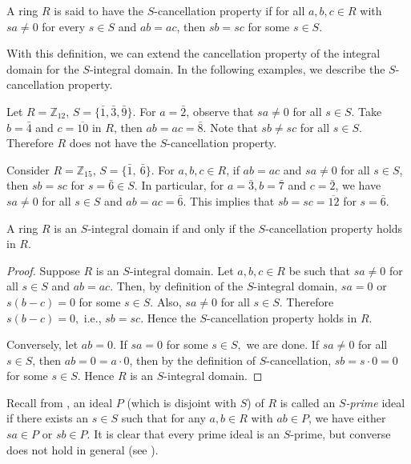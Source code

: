 \documentclass[11pt]{article}
\begin{document}
	\begin{deff}\label{cancel}
		A ring $R$ is said to have the $S$-cancellation property if for all $a,b,c\in R$ with $sa\neq 0$ for every $s\in S$ and $ab=ac$, then $sb=sc$ for some $s\in S$.
	\end{deff}
	With this definition, we can extend the cancellation property of the integral domain for the $S$-integral domain. In the following examples, we describe the $S$-cancellation property.
	\begin{eg}
		Let $R=\mathbb{Z}_{12}$, $S=\{\bar{1},\bar{3},\bar{9}\}$. For $a=\bar{2}$, observe that $sa\neq 0$ for all $s\in S$. Take $b=\bar{4}$ and $c=\overline{10}$ in $R$, then $ab=ac=\bar{8}$. Note that $sb\neq sc$ for all $s\in S$. Therefore $R$ does not have the $S$-cancellation property. 
	\end{eg}
	\begin{eg}
		Consider $R=\mathbb{Z}_{15}$, $S=\{\bar{1}, ~\bar{6}\}$. For $a, b, c\in R$, if $ab=ac$ and $sa\neq 0$ for all $s\in S$, then $sb=sc$ for $s=\bar{6}\in S$. In particular, for $a=\bar{3}, b=\bar{7}$ and $c=\bar{2}$, we have $sa\neq 0$ for all $s\in S$ and $ab=ac=\bar{6}$. This implies that $sb=sc=\overline{12}$ for $s=\bar{6}$. 
	\end{eg}
	\begin{prop}\label{scancellation}
		A ring $R$ is an $S$-integral domain if and only if the $S$-cancellation property holds in $R$.
	\end{prop}
	\begin{proof}
		Suppose $R$ is an $S$-integral domain. Let $a,b,c\in R$ be such that $sa\neq0$ for all $s\in S$ and $ab=ac$. Then, by definition of the $S$-integral domain, $sa=0$ or $s(b-c)=0$ for some $s\in S$. Also, $sa\neq 0 $ for all $s\in S$. Therefore $s(b-c)=0,$ i.e., $sb=sc$. Hence the $S$-cancellation property holds in $R.$ 
		
		Conversely, let $ab=0$. If $sa=0$ for some $s\in S,$ we are done. If $sa\neq 0$ for all $s\in S$, then $ab=0=a\cdot 0$, then by the definition of $S$-cancellation, $sb=s\cdot 0=0$ for some $s\in S$. Hence $R$ is an $S$-integral domain.
	\end{proof}
	
	Recall from \cite{ah20}, an ideal $P$ (which is disjoint with $S$) of $R$ is called an \textit{$S$-prime} ideal if there exists an $s \in S$ such that for any $a, b \in R$ with $ab \in P$, we have either $sa \in P$ or $sb \in P$. It is clear that every prime ideal is an $S$-prime, but converse does not hold in general (see \cite[Example 1(3)]{ah20}). 
	
\end{document}
